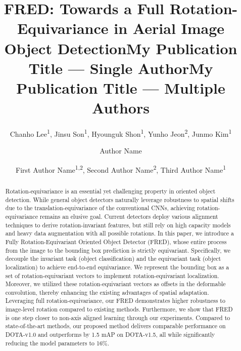 \documentclass[letterpaper]{article} %
\title{FRED: Towards a Full Rotation-Equivariance in Aerial Image Object Detection}
\author{
    Chanho Lee\textsuperscript{\rm 1},
    Jinsu Son\textsuperscript{\rm 1},
    Hyounguk Shon\textsuperscript{\rm 1},
    Yunho Jeon\textsuperscript{\rm 2},
    Junmo Kim\textsuperscript{\rm 1}
}
\title{My Publication Title --- Single Author}
\author {
    Author Name
}
\title{My Publication Title --- Multiple Authors}
\author {
    First Author Name\textsuperscript{\rm 1,\rm 2},
    Second Author Name\textsuperscript{\rm 2},
    Third Author Name\textsuperscript{\rm 1}
}
\begin{document}
\maketitle


\begin{abstract}
Rotation-equivariance is an essential yet challenging property in oriented object detection. While general object detectors naturally leverage robustness to spatial shifts due to the translation-equivariance of the conventional CNNs, achieving rotation-equivariance remains an elusive goal. Current detectors deploy various alignment techniques to derive rotation-invariant features, but still rely on high capacity models and heavy data augmentation with all possible rotations. In this paper, we introduce a Fully Rotation-Equivariant Oriented Object Detector (FRED), whose entire process from the image to the bounding box prediction is strictly equivariant. Specifically, we decouple the invariant task (object classification) and the equivariant task (object localization) to achieve end-to-end equivariance. We represent the bounding box as a set of rotation-equivariant vectors to implement rotation-equivariant localization. Moreover, we utilized these rotation-equivariant vectors as offsets in the deformable convolution, thereby enhancing the existing advantages of spatial adaptation. Leveraging full rotation-equivariance, our FRED demonstrates higher robustness to image-level rotation compared to existing methods. Furthermore, we show that FRED is one step closer to non-axis aligned learning through our experiments. Compared to state-of-the-art methods, our proposed method delivers comparable performance on DOTA-v1.0 and outperforms by 1.5 mAP on DOTA-v1.5, all while significantly reducing the model parameters to 16\%.
\end{abstract}
\end{document}
